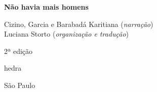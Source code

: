




\begingroup\thispagestyle{empty}\vspace*{.05\textheight} 

              {\formular
              \huge
              \noindent
              \textbf{Não havia mais homens}\\
              
              \vspace{-0.5cm}
              
              }


              

              \vfill              

              {\small
              \noindent{}Cizino, Garcia e Barabadá Karitiana (\textit{narração})\vspace{0.2cm}\\
              \noindent{}Luciana Storto (\textit{organização e tradução})
              }

              \vspace{0.5cm}

              {\small\noindent{}2ª edição}

              \vfill
              \newfontfamily{}
              {\noindent\fontsize{30}{40}\selectfont \timesnewroman hedra}

              {\selectfont\small\noindent São Paulo \quad\the\year}

\endgroup
\pagebreak
